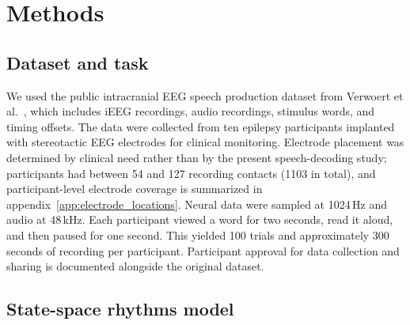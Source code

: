 \documentclass{iopjournal}
\begin{document}
\section{Methods}

\subsection{Dataset and task}

We used the public intracranial EEG speech production dataset from Verwoert et al.~\cite{dataset}, which includes iEEG recordings, audio recordings, stimulus words, and timing offsets. The data were collected from ten epilepsy participants implanted with stereotactic EEG electrodes for clinical monitoring. Electrode placement was determined by clinical need rather than by the present speech-decoding study; participants had between 54 and 127 recording contacts (1103 in total), and participant-level electrode coverage is summarized in appendix~\ref{app:electrode_locations}. Neural data were sampled at 1024\,Hz and audio at 48\,kHz. Each participant viewed a word for two seconds, read it aloud, and then paused for one second. This yielded 100 trials and approximately 300 seconds of recording per participant. Participant approval for data collection and sharing is documented alongside the original dataset.

\subsection{State-space rhythms model}
\end{document}
